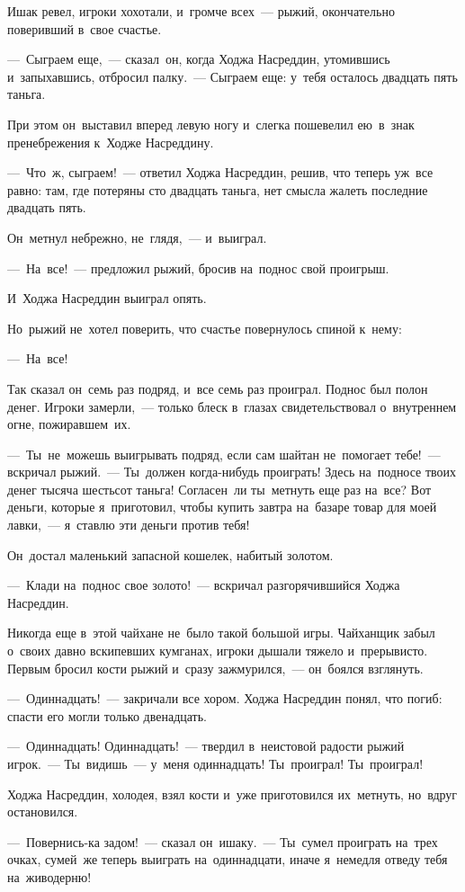 \documentclass[12pt,a4paper]{book}
\begin{document}
Ишак ревел, игроки хохотали, и~громче всех~— рыжий, окончательно поверивший в~свое счастье.

—~Сыграем еще,~— сказал~он, когда Ходжа Насреддин, утомившись и~запыхавшись, отбросил палку.~— Сыграем еще: у~тебя осталось двадцать пять таньга.

При этом он~выставил вперед левую ногу и~слегка пошевелил ею~в~знак пренебрежения к~Ходже Насреддину.

—~Что~ж, сыграем!~— ответил Ходжа Насреддин, решив, что теперь уж~все равно: там, где потеряны сто двадцать таньга, нет смысла жалеть последние двадцать пять.

Он~метнул небрежно, не~глядя,~— и~выиграл.

—~На~все!~— предложил рыжий, бросив на~поднос свой проигрыш.

И~Ходжа Насреддин выиграл опять.

Но~рыжий не~хотел поверить, что счастье повернулось спиной к~нему:

—~На~все!

Так сказал он~семь раз подряд, и~все семь раз проиграл. Поднос был полон денег. Игроки замерли,~— только блеск в~глазах свидетельствовал о~внутреннем огне, пожиравшем~их.

—~Ты~не~можешь выигрывать подряд, если сам шайтан не~помогает тебе!~— вскричал рыжий.~— Ты~должен когда-нибудь проиграть! Здесь на~подносе твоих денег тысяча шестьсот таньга! Согласен~ли ты~метнуть еще раз на~все? Вот деньги, которые я~приготовил, чтобы купить завтра на~базаре товар для моей лавки,~— я~ставлю эти деньги против тебя!

Он~достал маленький запасной кошелек, набитый золотом.

—~Клади на~поднос свое золото!~— вскричал разгорячившийся Ходжа Насреддин.

Никогда еще в~этой чайхане не~было такой большой игры. Чайханщик забыл о~своих давно вскипевших кумганах, игроки дышали тяжело и~прерывисто. Первым бросил кости рыжий и~сразу зажмурился,~— он~боялся взглянуть.

—~Одиннадцать!~— закричали все хором. Ходжа Насреддин понял, что погиб: спасти его могли только двенадцать.

—~Одиннадцать! Одиннадцать!~— твердил в~неистовой радости рыжий игрок.~— Ты~видишь~— у~меня одиннадцать! Ты~проиграл! Ты~проиграл!

Ходжа Насреддин, холодея, взял кости и~уже приготовился их~метнуть, но~вдруг остановился.

—~Повернись-ка задом!~— сказал он~ишаку.~— Ты~сумел проиграть на~трех очках, сумей~же теперь выиграть на~одиннадцати, иначе я~немедля отведу тебя на~живодерню!
\end{document}
